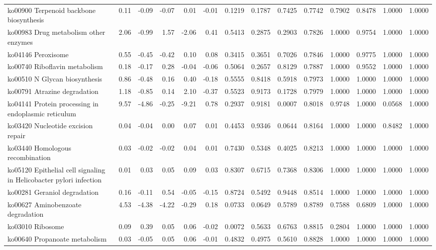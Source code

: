 {\begin{landscape}
\begin{longtable}{ | l | r | r | r | r | r | r  | r | r | r | r | r | r  | r  |}
			ko00900  Terpenoid backbone biosynthesis & 0.11 & -0.09 & -0.07 & 0.01 & -0.01 & 0.1219 & 0.1787 & 0.7425 & 0.7742 & 0.7902 & 0.8478 & 1.0000 & 1.0000 \\ 
			ko00983  Drug metabolism other enzymes & 2.06 & -0.99 & 1.57 & -2.06 & 0.41 & 0.5413 & 0.2875 & 0.2903 & 0.7826 & 1.0000 & 0.9754 & 1.0000 & 1.0000 \\ 
			ko04146  Peroxisome & 0.55 & -0.45 & -0.42 & 0.10 & 0.08 & 0.3415 & 0.3651 & 0.7026 & 0.7846 & 1.0000 & 0.9775 & 1.0000 & 1.0000 \\ 
			ko00740  Riboflavin metabolism & 0.18 & -0.17 & 0.28 & -0.04 & -0.06 & 0.5064 & 0.2657 & 0.8129 & 0.7887 & 1.0000 & 0.9552 & 1.0000 & 1.0000 \\ 
			ko00510  N Glycan biosynthesis & 0.86 & -0.48 & 0.16 & 0.40 & -0.18 & 0.5555 & 0.8418 & 0.5918 & 0.7973 & 1.0000 & 1.0000 & 1.0000 & 1.0000 \\ 
			ko00791  Atrazine degradation & 1.18 & -0.85 & 0.14 & 2.10 & -0.37 & 0.5523 & 0.9173 & 0.1728 & 0.7979 & 1.0000 & 1.0000 & 1.0000 & 1.0000 \\ 
			ko04141  Protein processing in endoplasmic reticulum & 9.57 & -4.86 & -0.25 & -9.21 & 0.78 & 0.2937 & 0.9181 & 0.0007 & 0.8018 & 0.9748 & 1.0000 & 0.0568 & 1.0000 \\ 
			ko03420  Nucleotide excision repair & 0.04 & -0.04 & 0.00 & 0.07 & 0.01 & 0.4453 & 0.9346 & 0.0644 & 0.8164 & 1.0000 & 1.0000 & 0.8482 & 1.0000 \\ 
			ko03440  Homologous recombination & 0.03 & -0.02 & -0.02 & 0.04 & 0.01 & 0.7430 & 0.5348 & 0.4025 & 0.8213 & 1.0000 & 1.0000 & 1.0000 & 1.0000 \\ 
			ko05120  Epithelial cell signaling in Helicobacter pylori infection & 0.01 & 0.03 & 0.05 & 0.09 & 0.03 & 0.8307 & 0.6715 & 0.7368 & 0.8306 & 1.0000 & 1.0000 & 1.0000 & 1.0000 \\ 
			ko00281  Geraniol degradation & 0.16 & -0.11 & 0.54 & -0.05 & -0.15 & 0.8724 & 0.5492 & 0.9448 & 0.8514 & 1.0000 & 1.0000 & 1.0000 & 1.0000 \\ 
			ko00627  Aminobenzoate degradation & 4.53 & -4.38 & -4.22 & -0.29 & 0.18 & 0.0733 & 0.0649 & 0.5789 & 0.8789 & 0.7588 & 0.6809 & 1.0000 & 1.0000 \\ 
			ko03010  Ribosome & 0.09 & 0.39 & 0.05 & 0.06 & -0.02 & 0.0072 & 0.5633 & 0.6763 & 0.8815 & 0.2804 & 1.0000 & 1.0000 & 1.0000 \\ 
			ko00640  Propanoate metabolism & 0.03 & -0.05 & 0.05 & 0.06 & -0.01 & 0.4832 & 0.4975 & 0.5610 & 0.8828 & 1.0000 & 1.0000 & 1.0000 & 1.0000 \\ 

\end{longtable}
\end{landscape}}
